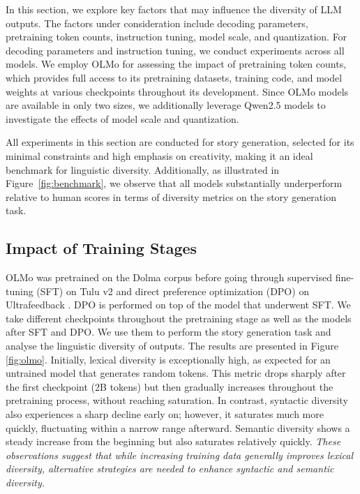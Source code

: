 \documentclass[11pt,a4paper]{article}
\begin{document}
In this section, we explore key factors that may influence the diversity of LLM outputs. The factors under consideration include decoding parameters, pretraining token counts, instruction tuning, model scale, and quantization. For decoding parameters and instruction tuning, we conduct experiments across all models. We employ OLMo for assessing the impact of pretraining token counts, which 
provides full access to its pretraining datasets, training code, and model weights at various checkpoints throughout its development. Since OLMo models are available in only two sizes, we additionally leverage Qwen2.5 models \citep{yang2024qwen2} to investigate the effects of model scale and quantization.

All experiments in this section are conducted for story generation, selected for its minimal constraints and high emphasis on creativity, making it an ideal benchmark for linguistic diversity. Additionally, as illustrated in Figure~\ref{fig:benchmark}, we observe that all models substantially underperform relative to human scores in terms of diversity metrics on the story generation task.




\subsection{Impact of Training Stages}\label{sec:training_stages}

OLMo was pretrained on the Dolma corpus \citep{soldaini-etal-2024-dolma} before going through supervised fine-tuning (SFT) on Tulu v2 \citep{ivison2023camelschangingclimateenhancing} and direct preference optimization (DPO) \citep{rafailov2023direct} on Ultrafeedback \citep{cui2024ultrafeedback}. DPO is performed on top of the model that underwent SFT. We take different checkpoints throughout the pretraining stage as well as the models after SFT and DPO. We use them to perform the story generation task and analyse the linguistic diversity of outputs. The results are presented in Figure \ref{fig:olmo}.
Initially, lexical diversity is exceptionally high, as expected for an untrained model that generates random tokens. This metric drops sharply after the first checkpoint (2B tokens) but then gradually increases throughout the pretraining process, without reaching saturation. In contrast, syntactic diversity also experiences a sharp decline early on; however, it saturates much more quickly, fluctuating within a narrow range afterward. Semantic diversity shows a steady increase from the beginning but also saturates relatively quickly. \textit{These observations suggest that while increasing training data generally improves lexical diversity, alternative strategies are needed to enhance syntactic and semantic diversity.}
\end{document}
